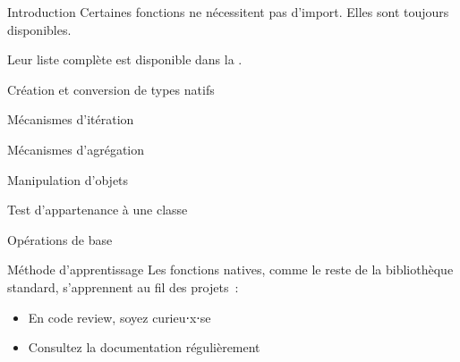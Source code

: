 \begin{frame}{Introduction}
  Certaines fonctions ne nécessitent pas d'import. Elles sont toujours disponibles.

  Leur liste complète est disponible dans la .
\end{frame}

\begin{frame}{Création et conversion de types natifs}
\end{frame}

\begin{frame}{Mécanismes d'itération}
\end{frame}

\begin{frame}{Mécanismes d'agrégation}
\end{frame}

\begin{frame}{Manipulation d'objets}
\end{frame}

\begin{frame}{Test d'appartenance à une classe}
\end{frame}

\begin{frame}{Opérations de base}
\end{frame}

\begin{frame}{Méthode d'apprentissage}
  Les fonctions natives, comme le reste de la bibliothèque standard, s'apprennent au fil des projets~:

  \begin{itemize}[<+(1)->]
    \item En code review, soyez curieu⋅x⋅se
    \item Consultez la documentation régulièrement
  \end{itemize}
\end{frame}
